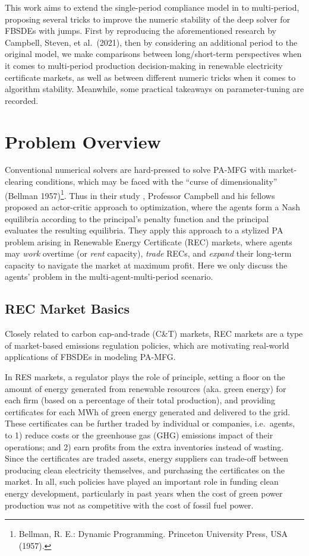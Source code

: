 \documentclass[a4paper,10pt]{article}
\newcommand{\1}{\mathbf{1}}
\begin{document}
\normalsize This work aims to extend the single-period compliance model in \cite{SC} to
multi-period, proposing several tricks to improve the numeric stability of the deep solver for FBSDEs with jumps. First by reproducing the aforementioned research by Campbell, Steven, et al.~(2021), then by considering an additional period to the original model, we make comparisons between long/short-term perspectives when it comes to multi-period production decision-making in renewable electricity certificate markets, as well as between different numeric tricks when it comes to algorithm stability. Meanwhile, some practical takeaways on parameter-tuning are recorded.

\section{Problem Overview}

Conventional numerical solvers are hard-pressed to solve PA-MFG with
market-clearing conditions, which may be faced with the ``curse of
dimensionality'' (Bellman 1957)\footnote{Bellman, R. E.: Dynamic
  Programming. Princeton University Press, USA (1957).}. Thus in their
study \cite{SC},
Professor Campbell and his fellows proposed an actor-critic approach to
optimization, where the agents form a Nash equilibria according to the
principal's penalty function and the principal evaluates the resulting
equilibria. They apply this approach to a stylized PA problem
arising in Renewable Energy Certificate (REC) markets, where agents may
\emph{work} overtime (or \emph{rent} capacity), \emph{trade} RECs, and
\emph{expand} their long-term capacity to navigate the market at maximum
profit. Here we only discuss the agents' problem in the
multi-agent-multi-period scenario.

\subsection{REC Market Basics}

Closely related to carbon cap-and-trade (C\&T) markets, REC markets are
a type of market-based emissions regulation policies, which are
motivating real-world applications of FBSDEs in modeling PA-MFG.

In RES markets, a regulator plays the role of principle, setting a floor
on the amount of energy generated from renewable resources (aka. green
energy) for each firm (based on a percentage of their total production),
and providing certificates for each MWh of green energy generated and
delivered to the grid. These certificates can be further traded by
individual or companies, i.e.~agents, to 1) reduce costs or the
greenhouse gas (GHG) emissions impact of their operations; and 2) earn
profits from the extra inventories instead of wasting. Since the
certificates are traded assets, energy suppliers can trade-off between
producing clean electricity themselves, and purchasing the certificates
on the market. In all, such policies have played an important role in
funding clean energy development, particularly in past years when the
cost of green power production was not as competitive with the cost of
fossil fuel power.
\end{document}
